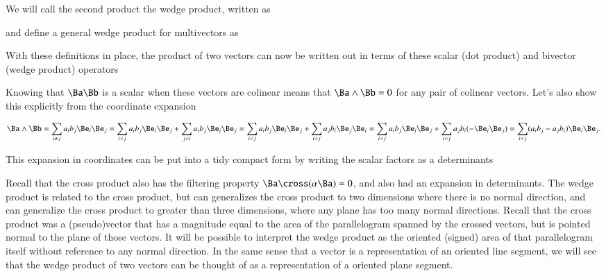 We will call the second product the wedge product, written as


and define a general wedge product for multivectors as


With these definitions in place, the product of two vectors can now be written out in terms of these scalar (dot product) and bivector (wedge product) operators


Knowing that \( \Ba \Bb \) is a scalar when these vectors are colinear means that \( \Ba \wedge \Bb = 0 \) for any pair of colinear vectors.  Let's also show this explicitly from the coordinate expansion

\begin{dmath}\label{eqn:SimpleProducts2:1460}
\Ba \wedge \Bb
=
\sum_{i \ne j} a_i b_j \Be_i \Be_j
=
\sum_{i < j} a_i b_j \Be_i \Be_j
+
\sum_{j < i} a_i b_j \Be_i \Be_j
=
\sum_{i < j} a_i b_j \Be_i \Be_j
+
\sum_{i < j} a_j b_i \Be_j \Be_i
=
\sum_{i < j} a_i b_j \Be_i \Be_j
+
\sum_{i < j} a_j b_i (-\Be_i \Be_j)
=
\sum_{i < j} (a_i b_j - a_j b_i) \Be_i \Be_j.
\end{dmath}

This expansion in coordinates can be put into a tidy compact form by writing the scalar factors as a determinants


Recall that the  cross product also has the filtering property \( \Ba \cross (\alpha \Ba) = 0 \), and also had an expansion in determinants.  
The wedge product is related to the cross product, but can generalizes the cross product to two dimensions where there is no normal direction, and can generalize the cross product to greater than three dimensions, where any plane has too many normal directions.  
Recall that the cross product was a (pseudo)vector that has a magnitude equal to the area of the parallelogram spanned by the crossed vectors, but is pointed normal to the plane of those vectors.
It will be possible to interpret the wedge product as the oriented (signed) area of that parallelogram itself without reference to any normal direction.
In the same sense that a vector is a representation of an oriented line segment, we will see that the 
wedge product of two vectors can be thought of as a representation of a oriented plane segment.

